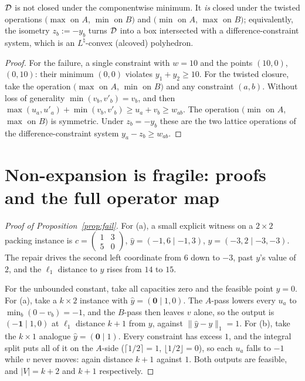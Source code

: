 \begin{proposition}\label{prop:lattice}
$\mathcal{D}$ is not closed under the componentwise minimum. It \emph{is} closed under the twisted
operations $(\max$ on $A$, $\min$ on $B)$ and $(\min$ on $A$, $\max$ on $B)$; equivalently, the
isometry $z_b := -y_b$ turns $\mathcal{D}$ into a box intersected with a difference-constraint system,
which is an $L^\natural$-convex (alcoved) polyhedron.
\end{proposition}
\begin{proof}
For the failure, a single constraint with $w = 10$ and the points $(10,0)$, $(0,10)$: their minimum
$(0,0)$ violates $y_1 + y_2 \ge 10$. For the twisted closure, take the operation $(\max$ on $A$, $\min$ on $B)$ and any constraint
$(a,b)$. Without loss of generality $\min(v_b, v'_b) = v_b$, and then
$\max(u_a,u'_a) + \min(v_b,v'_b) \ge u_a + v_b \ge w_{ab}$. The operation
$(\min$ on $A$, $\max$ on $B)$ is symmetric. Under $z_b = -y_b$ these are the two lattice
operations of the difference-constraint system $y_a - z_b \ge w_{ab}$.
\end{proof}

\section{Non-expansion is fragile: proofs and the full operator map}\label{app:delicate}

\begin{proof}[Proof of Proposition~\ref{prop:fail}]
For (a), a small explicit witness on a $2\times2$ packing instance is
$c = \left(\begin{smallmatrix}1&3\\5&0\end{smallmatrix}\right)$,
$\hat{y} = (-1, 6 \mid -1, 3)$, $y = (-3, 2 \mid -3, -3)$. The repair drives the second left coordinate
from $6$ down to $-3$, past $y$'s value of $2$, and the $\ell_1$ distance to $y$ rises from $14$ to
$15$.

For the unbounded constant, take all capacities zero and the feasible point $y = 0$. For (a), take
a $k \times 2$ instance with $\hat y = (\mathbf{0} \mid 1, 0)$. The $A$-pass lowers every $u_a$ to
$\min_b(0 - v_b) = -1$, and the $B$-pass then leaves $v$ alone, so the output is
$(-\mathbf{1} \mid 1, 0)$ at $\ell_1$ distance $k+1$ from $y$, against $\|\hat y - y\|_1 = 1$. For (b),
take the $k \times 1$ analogue $\hat y = (\mathbf{0} \mid 1)$. Every constraint has excess $1$, and the
integral split puts all of it on the $A$-side ($\lceil 1/2 \rceil = 1$,
$\lfloor 1/2 \rfloor = 0$), so each $u_a$ falls to $-1$ while $v$ never moves: again distance $k+1$
against $1$. Both outputs are feasible, and $|V| = k+2$ and $k+1$ respectively.
\end{proof}

